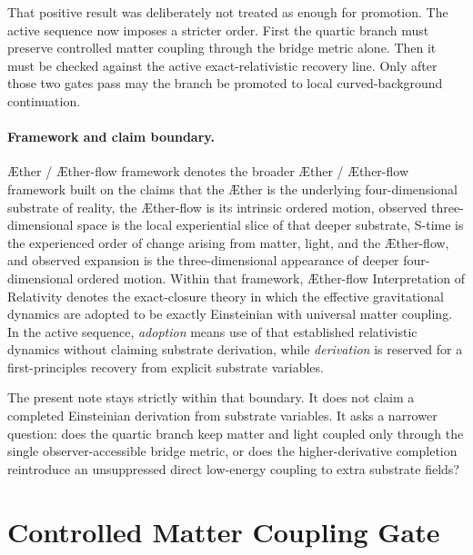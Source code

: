 \documentclass[11pt]{article}
\newcommand{\Aether}{\AE{}ther}
\newcommand{\Aflow}{\AE{}ther-flow}
\newcommand{\TheoryName}{\Aflow{} Interpretation of Relativity}
\newcommand{\TheoryProgram}{\Aether{} / \Aflow{} framework}
\begin{document}
That positive result was deliberately not treated as enough for promotion. The active sequence now imposes a stricter order. First the quartic branch must preserve controlled matter coupling through the bridge metric alone. Then it must be checked against the active exact-relativistic recovery line. Only after those two gates pass may the branch be promoted to local curved-background continuation.

\paragraph{Framework and claim boundary.}
\TheoryProgram{} denotes the broader \Aether{} / \Aflow{} framework built on the claims that the \Aether{} is the underlying four-dimensional substrate of reality, the \Aflow{} is its intrinsic ordered motion, observed three-dimensional space is the local experiential slice of that deeper substrate, S-time is the experienced order of change arising from matter, light, and the \Aflow{}, and observed expansion is the three-dimensional appearance of deeper four-dimensional ordered motion. Within that framework, \TheoryName{} denotes the exact-closure theory in which the effective gravitational dynamics are adopted to be exactly Einsteinian with universal matter coupling. In the active sequence, \emph{adoption} means use of that established relativistic dynamics without claiming substrate derivation, while \emph{derivation} is reserved for a first-principles recovery from explicit substrate variables.

The present note stays strictly within that boundary. It does not claim a completed Einsteinian derivation from substrate variables. It asks a narrower question: does the quartic branch keep matter and light coupled only through the single observer-accessible bridge metric, or does the higher-derivative completion reintroduce an unsuppressed direct low-energy coupling to extra substrate fields?

\section{Controlled Matter Coupling Gate}
\end{document}
